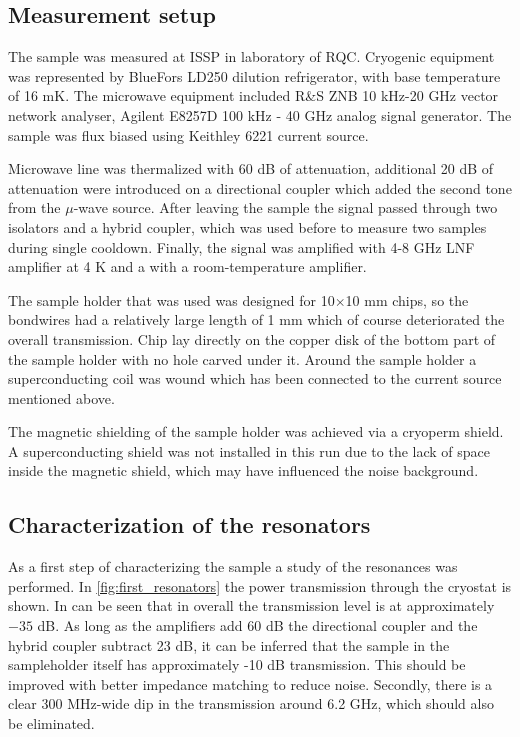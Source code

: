 \documentclass[12pt, twoside]{report}
\numberwithin{equation}{section}
\begin{document}
\subsection{Measurement setup}

The sample was measured at ISSP in laboratory of RQC. Cryogenic equipment was represented by BlueFors LD250 dilution refrigerator, with base temperature of 16 mK. The microwave equipment included R\&S ZNB 10 kHz-20 GHz vector network analyser,  Agilent E8257D 100 kHz - 40 GHz analog signal generator. The sample was flux biased using Keithley 6221 current source.

Microwave line was thermalized with 60 dB of attenuation, additional 20 dB of attenuation were introduced on a directional coupler which added the second tone from the $\mu$-wave source. After leaving the sample the signal passed through two isolators and a hybrid coupler, which was used before to measure two samples during single cooldown. Finally, the signal was amplified with 4-8 GHz LNF amplifier at 4 K and a with a room-temperature amplifier.

The sample holder that was used was designed for 10$\times$10 mm chips, so the bondwires had a relatively large length of 1 mm which of course deteriorated the overall transmission. Chip lay directly on the copper disk of the bottom part of the sample holder with no hole carved under it. Around the sample holder a superconducting coil was wound which has been connected to the current source mentioned above.

The magnetic shielding of the sample holder was achieved via a cryoperm shield. A superconducting shield was not installed in this run due to the lack of space inside the magnetic shield, which may have influenced the noise background.


\subsection{Characterization of the resonators}

As a first step of characterizing the sample a study of the resonances was performed. In \autoref{fig:first_resonators} the power transmission through the cryostat is shown. In can be seen that in overall the transmission level is at approximately $-35$ dB. As long as the amplifiers add 60 dB the directional coupler and the hybrid coupler subtract 23 dB, it can be inferred that the sample in the sampleholder itself has approximately -10 dB transmission. This should be improved with better impedance matching to reduce noise. Secondly, there is a clear 300 MHz-wide dip in the transmission around 6.2 GHz, which should also be eliminated.
\end{document}
